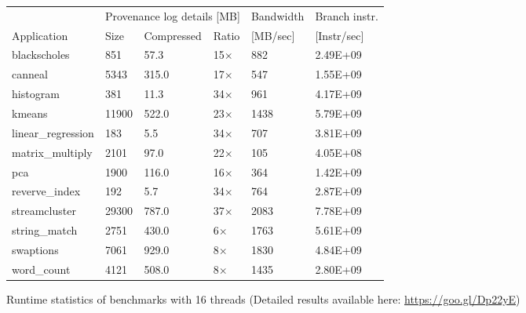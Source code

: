 \begin{figure}[t]
\centering
\myfontsize
{
\begin{tabular}{m{1.4cm}|m{.6cm}|m{1.2cm}|m{0.6cm}|m{1cm}|m{1.45cm}}
       & \multicolumn{3}{c|}{ Provenance log details [MB] }   &  Bandwidth & Branch instr. \\
   { Application} & Size & Compressed & Ratio & [MB/sec] &  [Instr/sec] \\
  \hline \hline
    blackscholes & 851& 57.3 & 15$\times$& 882& 2.49E+09 \\
    canneal& 5343& 315.0 &  17$\times$& 547& 1.55E+09 \\
    histogram& 381& 11.3 & 34$\times$& 961& 4.17E+09 \\
    kmeans& 11900& 522.0 & 23$\times$& 1438& 5.79E+09 \\
    linear\_regression& 183& 5.5 & 34$\times$& 707& 3.81E+09 \\
    matrix\_multiply& 2101& 97.0 & 22$\times$& 105& 4.05E+08 \\
    pca& 1900& 116.0 & 16$\times$& 364& 1.42E+09 \\
    reverve\_index& 192& 5.7 & 34$\times$& 764& 2.87E+09 \\
    streamcluster& 29300& 787.0 & 37$\times$& 2083& 7.78E+09 \\
    string\_match& 2751& 430.0 & 6$\times$& 1763& 5.61E+09 \\
    swaptions& 7061& 929.0 & 8$\times$& 1830& 4.84E+09 \\
    word\_count& 4121& 508.0 & 8$\times$& 1435& 2.80E+09 \\

\hline
\end{tabular}
}

\caption{Runtime statistics of benchmarks with 16 threads (Detailed results available here: \href{https://goo.gl/Dp22yE}{https://goo.gl/Dp22yE}) }                                                                                                                                      \label{tab:apps}
\end{figure}
